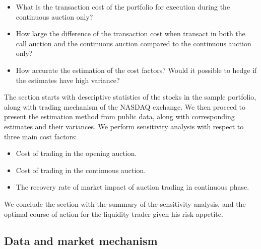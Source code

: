 \documentclass{article}
\begin{document}
\begin{itemize}
  \item What is the transaction cost of the portfolio for execution during the continuous auction only?
  \item How large the difference of the transaction cost when transact in both the call auction and the continuous auction compared to the continuous auction only?
  \item How accurate the estimation of the cost factors? Would it possible to hedge if the estimates have high variance?
\end{itemize}

The section starts with descriptive statistics of the stocks in the sample portfolio, along with trading mechanism of the NASDAQ exchange. We then proceed to present the estimation method from public data, along with corresponding estimates and their variances. We perform sensitivity analysis with respect to three main cost factors:
\begin{itemize}
  \item Cost of trading in the opening auction.
  \item Cost of trading in the continuous auction.
  \item The recovery rate of market impact of auction trading in continuous phase.
\end{itemize}

We conclude the section with the summary of the sensitivity analysis, and the optimal course of action for the liquidity trader given his risk appetite.

\subsection{Data and market mechanism}
\end{document}
